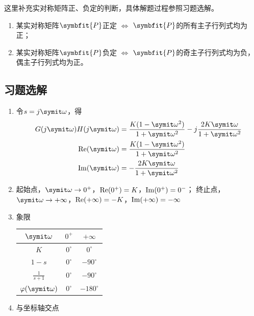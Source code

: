 这里补充实对称矩阵正、负定的判断，具体解题过程参照习题选解。
\begin{enumerate}
    \item 某实对称矩阵$\symbfit{P}$正定 $\Leftrightarrow$ $\symbfit{P}$的所有主子行列式均为正；
    \item 某实对称矩阵$\symbfit{P}$负定 $\Leftrightarrow$ $\symbfit{P}$的奇主子行列式均为负，偶主子行列式均为正。
\end{enumerate}

\subsection{习题选解}

\begin{exercise} %
    \begin{enumerate}
        \item 令$s=j\varomega$，得
        \begin{align*}
            G(j\varomega)H(j\varomega) &= \frac{K(1-\varomega^2)}{1+\varomega^2} - j\frac{2K\varomega}{1+\varomega^2} \\
            {\rm Re}(\varomega) &= \frac{K(1-\varomega^2)}{1+\varomega^2} \\
            {\rm Im}(\varomega) &= -\frac{2K\varomega}{1+\varomega^2}
        \end{align*}
        \item 起始点，$\varomega \to 0^+$，${\rm Re}(0^+) = K$，${\rm Im}(0^+) = 0^-$；
        终止点，$\varomega \to +\infty$，${\rm Re}(+\infty) = -K$，${\rm Im}(+\infty) = -\infty$
        \item 象限
        \begin{table}[H]
            \centering
            \begin{tabular}{ccc}
                \toprule
                $\varomega$ & $0^+$ & $+\infty$ \\
                \hline
                $K$ & $0^{\circ}$ & $0^{\circ}$ \\
                $1-s$ & $0^{\circ}$ & $-90^{\circ}$ \\
                $\frac{1}{s+1}$ & $0^{\circ}$ & $-90^{\circ}$ \\
                \hline
                $\varphi(\varomega)$ & $0^{\circ}$ & $-180^{\circ}$ \\
                \bottomrule
            \end{tabular}
        \end{table}
        \item 与坐标轴交点

\end{enumerate}
\end{exercise}
